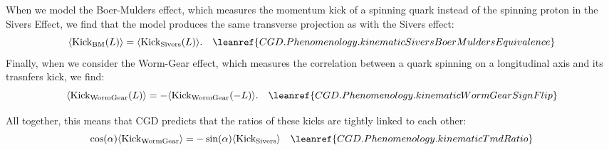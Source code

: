 When we model the Boer-Mulders effect, which measures the momentum kick of a spinning quark instead of the spinning proton in the Sivers Effect, we find that the model produces the same transverse projection as with the Sivers effect:
\begin{equation}
    \langle \text{Kick}_{\text{BM}}(L) \rangle = \langle \text{Kick}_{\text{Sivers}}(L) \rangle .
    \quad \leanref{CGD.Phenomenology.kinematicSiversBoerMuldersEquivalence}
    \label{eq:kinematicSiversBoerMuldersEquivalence}
\end{equation}
\noindent Finally, when we consider the Worm-Gear effect, which measures the correlation between a quark spinning on a longitudinal axis and its trasnfers kick, we find:
\begin{equation}
    \langle \text{Kick}_{\text{WormGear}}(L) \rangle = - \langle \text{Kick}_{\text{WormGear}}(-L) \rangle .
    \quad \leanref{CGD.Phenomenology.kinematicWormGearSignFlip}
    \label{eq:kinematicWormGearSignFlip}
\end{equation}

All together, this means that CGD predicts that the ratios of these kicks are tightly linked to each other:
\begin{equation}
    \cos(\alpha) \langle \text{Kick}_{\text{WormGear}} \rangle = - \sin(\alpha) \langle \text{Kick}_{\text{Sivers}} \rangle
    \quad \leanref{CGD.Phenomenology.kinematicTmdRatio}
    \label{eq:kinematicTmdRatio}
\end{equation}

